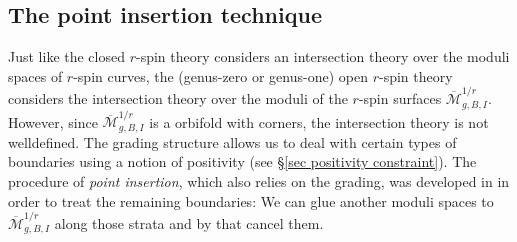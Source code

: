 \documentclass[11pt]{amsart}
\theoremstyle{definition}
\theoremstyle{remark}
\newcommand{\<}{\left<}
\renewcommand{\>}{\right>}
\numberwithin{equation}{section}
\def\Mbar{{\overline{\mathcal M}}}
\begin{document}
\subsection{The point insertion technique}\label{subsec PI}
Just like the closed $r$-spin theory considers an intersection theory over the moduli spaces of $r$-spin curves,  the (genus-zero or genus-one) open $r$-spin theory considers the intersection theory over the moduli of the $r$-spin surfaces $\Mbar^{1/r}_{g,B,I}$. However, since $\Mbar^{1/r}_{g,B,I}$ is a orbifold with corners, the intersection theory is %
not welldefined. The %
grading structure allows us to deal with %
certain types of %
boundaries using a notion of positivity (see \S \ref{sec positivity constraint}). The procedure of \textit{point insertion}, which also relies on the grading, was developed in \cite{TZ1} in order to treat the remaining %
boundaries: We can %
glue another moduli spaces  to $\Mbar^{1/r}_{g,B,I}$ along those strata and by that cancel them. 
\end{document}
